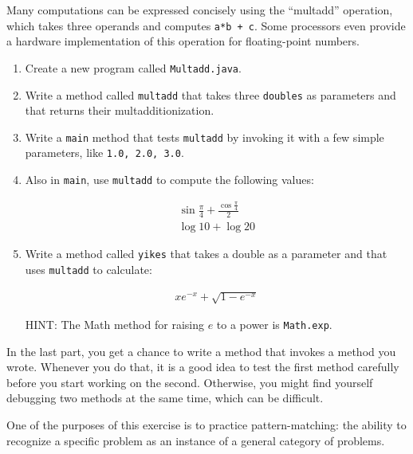 \documentclass[12pt]{book}
\begin{document}
\begin{exercise}
\label{ex.multadd}

Many computations can be expressed concisely using the ``multadd'' operation, which takes three operands and computes {\tt a*b + c}.
Some processors even provide a hardware implementation of this operation for floating-point numbers.

\begin{enumerate}

\item Create a new program called {\tt Multadd.java}.

\item Write a method called {\tt multadd} that takes three {\tt doubles} as parameters and that returns their multadditionization.

\item Write a {\tt main} method that tests {\tt multadd} by invoking it with a few simple parameters, like {\tt 1.0, 2.0, 3.0}.

\item Also in {\tt main}, use {\tt multadd} to compute the following values:

\begin{eqnarray*}
& \sin \frac{\pi}{4} + \frac{\cos \frac{\pi}{4}}{2} & \\
& \log 10 + \log 20 &
\end{eqnarray*}

\item Write a method called {\tt yikes} that takes a double as a parameter and that uses {\tt multadd} to calculate:

\begin{eqnarray*}
x e^{-x} + \sqrt{1 - e^{-x}}
\end{eqnarray*}

HINT: The Math method for raising $e$ to a power is {\tt Math.exp}.

\end{enumerate}

In the last part, you get a chance to write a method that invokes a method you wrote.
Whenever you do that, it is a good idea to test the first method carefully before you start working on the second.
Otherwise, you might find yourself debugging two methods at the same time, which can be difficult.

One of the purposes of this exercise is to practice pattern-matching: the ability to recognize a specific problem as an instance of a general category of problems.
\end{exercise}
\end{document}
